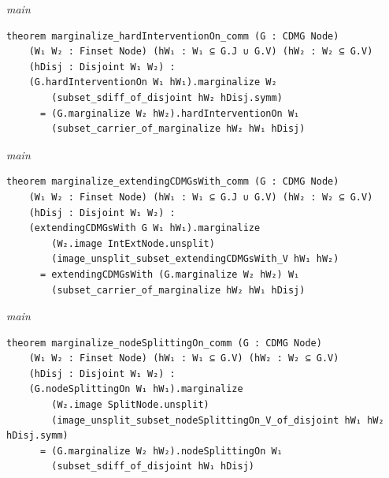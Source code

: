 {\small\textit{main}}
\begin{verbatim}
theorem marginalize_hardInterventionOn_comm (G : CDMG Node)
    (W₁ W₂ : Finset Node) (hW₁ : W₁ ⊆ G.J ∪ G.V) (hW₂ : W₂ ⊆ G.V)
    (hDisj : Disjoint W₁ W₂) :
    (G.hardInterventionOn W₁ hW₁).marginalize W₂
        (subset_sdiff_of_disjoint hW₂ hDisj.symm)
      = (G.marginalize W₂ hW₂).hardInterventionOn W₁
        (subset_carrier_of_marginalize hW₂ hW₁ hDisj)
\end{verbatim}
{\small\textit{main}}
\begin{verbatim}
theorem marginalize_extendingCDMGsWith_comm (G : CDMG Node)
    (W₁ W₂ : Finset Node) (hW₁ : W₁ ⊆ G.J ∪ G.V) (hW₂ : W₂ ⊆ G.V)
    (hDisj : Disjoint W₁ W₂) :
    (extendingCDMGsWith G W₁ hW₁).marginalize
        (W₂.image IntExtNode.unsplit)
        (image_unsplit_subset_extendingCDMGsWith_V hW₁ hW₂)
      = extendingCDMGsWith (G.marginalize W₂ hW₂) W₁
        (subset_carrier_of_marginalize hW₂ hW₁ hDisj)
\end{verbatim}
{\small\textit{main}}
\begin{verbatim}
theorem marginalize_nodeSplittingOn_comm (G : CDMG Node)
    (W₁ W₂ : Finset Node) (hW₁ : W₁ ⊆ G.V) (hW₂ : W₂ ⊆ G.V)
    (hDisj : Disjoint W₁ W₂) :
    (G.nodeSplittingOn W₁ hW₁).marginalize
        (W₂.image SplitNode.unsplit)
        (image_unsplit_subset_nodeSplittingOn_V_of_disjoint hW₁ hW₂ hDisj.symm)
      = (G.marginalize W₂ hW₂).nodeSplittingOn W₁
        (subset_sdiff_of_disjoint hW₁ hDisj)
\end{verbatim}
~%

\vspace{\appendixNotesGap}

